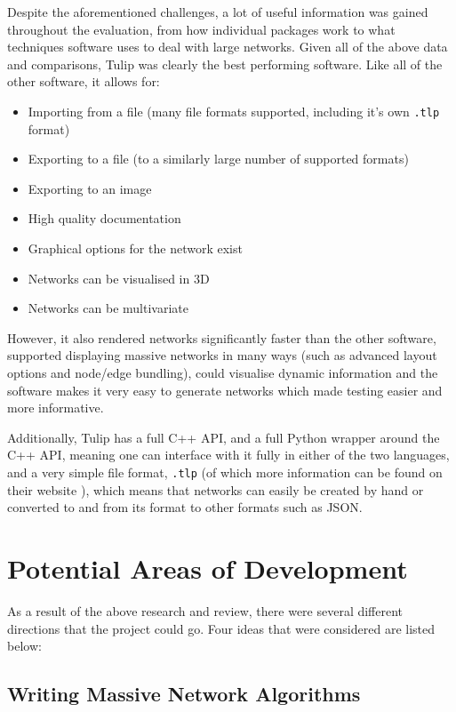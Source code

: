 \documentclass[../dissertation.tex]{subfiles}
\begin{document}
Despite the aforementioned challenges, a lot of useful information was gained throughout the evaluation, from how individual packages work to what techniques software uses to deal with large networks. Given all of the above data and comparisons, Tulip was clearly the best performing software. Like all of the other software, it allows for:
\begin{itemize}
    \item Importing from a file (many file formats supported, including it's own \texttt{.tlp} format)
    \item Exporting to a file (to a similarly large number of supported formats)
    \item Exporting to an image
    \item High quality documentation
    \item Graphical options for the network exist
    \item Networks can be visualised in 3D
    \item Networks can be multivariate
\end{itemize}

However, it also rendered networks significantly faster than the other software, supported displaying massive networks in many ways (such as advanced layout options and node/edge bundling), could visualise dynamic information and the software makes it very easy to generate networks which made testing easier and more informative. 

Additionally, Tulip has a full C++ API, and a full Python wrapper around the C++ API, meaning one can interface with it fully in either of the two languages, and a very simple file format, \texttt{.tlp} (of which more information can be found on their website \cite{tuliptlp}), which means that networks can easily be created by hand or converted to and from its format to other formats such as JSON.

\section{Potential Areas of Development}

As a result of the above research and review, there were several different directions that the project could go. Four ideas that were considered are listed below:

\subsection{Writing Massive Network Algorithms}
\end{document}
